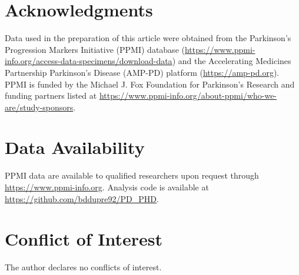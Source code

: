 \section*{Acknowledgments}

Data used in the preparation of this article were obtained from the
Parkinson's Progression Markers Initiative (PPMI) database
(\url{https://www.ppmi-info.org/access-data-specimens/download-data})
and the Accelerating Medicines Partnership Parkinson's Disease (AMP-PD)
platform (\url{https://amp-pd.org}). PPMI is funded by the Michael J.
Fox Foundation for Parkinson's Research and funding partners listed at
\url{https://www.ppmi-info.org/about-ppmi/who-we-are/study-sponsors}.


\section*{Data Availability}

PPMI data are available to qualified researchers upon request through
\url{https://www.ppmi-info.org}. Analysis code is available at
\url{https://github.com/bddupre92/PD_PHD}.


\section*{Conflict of Interest}

The author declares no conflicts of interest.


